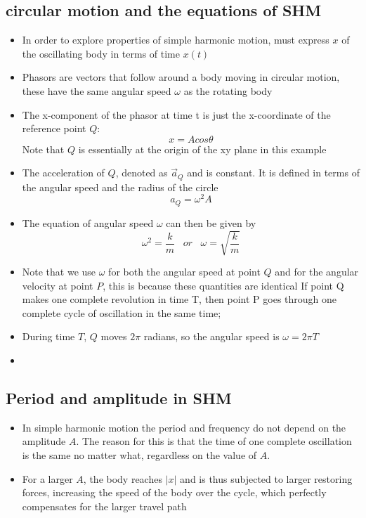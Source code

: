 \documentclass[11pt, a4paper]{article}
\begin{document}
\subsection{circular motion and the equations of SHM}
\begin{itemize}
    \item In order to explore properties of simple harmonic motion, must express $x$ of the
        oscillating body in terms of time $x(t)$
    \item Phasors are vectors that follow around a body moving in circular motion, these have
        the same angular speed $\omega$ as the rotating body
    \item The x-component of the phasor at time t is just the x-coordinate of the reference
        point $Q$:
        \begin{equation}
            x = Acos\theta
        \end{equation}
        Note that $Q$ is essentially at the origin of the xy plane in this example
    \item The acceleration of $Q$, denoted as $\vec{a}_{Q}$ and is constant. It is
        defined in terms of the angular speed and the radius of the circle
        \begin{equation}
            a_{Q} = \omega{}^2A
        \end{equation}
    \item The equation of angular speed $\omega$ can then be given by
        \begin{equation}
            \omega^{2} = \frac{k}{m} \; \; \; or \; \; \;  \omega = \sqrt{\frac{k}{m}}
        \end{equation}
    \item Note that we use $\omega$ for both the angular speed at point $Q$ and for the
        angular velocity at point $P$, this is because these quantities are identical
        If point Q makes one complete revolution in time T, then point P goes through
        one complete cycle of oscillation in the same time;
    \item During time $T$, $Q$ moves $2\pi$ radians, so the angular speed is $\omega = 2\pi T$
    \item
\end{itemize}
\subsection{Period and amplitude in SHM}
\begin{itemize}
    \item In simple harmonic motion the period and frequency do not depend on the amplitude $A$. The
        reason for this is that the time of one complete oscillation is the same no matter what,
        regardless on the value of $A$.
    \item For a larger $A$, the body reaches $\vert x \vert$ and is thus subjected to larger restoring
        forces, increasing the speed of the body over the cycle, which perfectly compensates for the
        larger travel path
\end{itemize}
\end{document}
